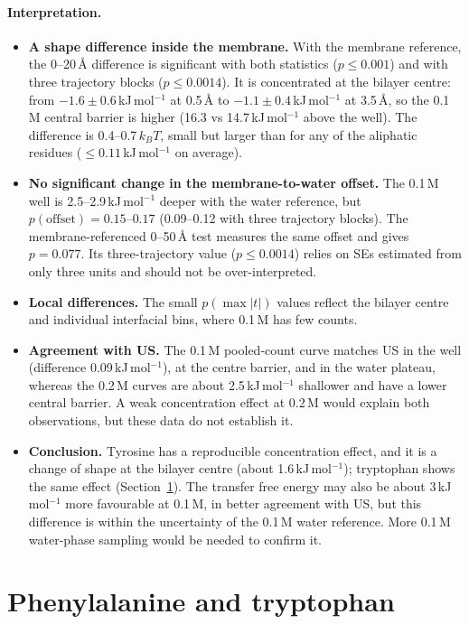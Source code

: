 \documentclass[11pt,a4paper]{article}
\newcommand{\kJ}{\,kJ\,mol$^{-1}$}
\begin{document}
\paragraph{Interpretation.}
\begin{itemize}
  \item \textbf{A shape difference inside the membrane.} With the membrane reference, the
  0--20\,\AA{} difference is significant with both statistics ($p \le 0.001$) and with three
  trajectory blocks ($p \le 0.0014$). It is concentrated at the bilayer centre: from
  $-1.6 \pm 0.6$\kJ{} at 0.5\,\AA{} to $-1.1 \pm 0.4$\kJ{} at 3.5\,\AA, so the 0.1\,M
  central barrier is higher (16.3 vs 14.7\kJ{} above the well). The difference is
  0.4--0.7\,$k_BT$, small but larger than for any of the aliphatic residues
  ($\le 0.11$\kJ{} on average).
  \item \textbf{No significant change in the membrane-to-water offset.} The 0.1\,M well is
  2.5--2.9\kJ{} deeper with the water reference, but $p(\text{offset}) = 0.15$--$0.17$
  (0.09--0.12 with three trajectory blocks). The membrane-referenced 0--50\,\AA{} test
  measures the same offset and gives $p = 0.077$. Its three-trajectory value
  ($p \le 0.0014$) relies on SEs estimated from only three units and should not be
  over-interpreted.
  \item \textbf{Local differences.} The small $p(\max|t|)$ values reflect the bilayer centre
  and individual interfacial bins, where 0.1\,M has few counts.
  \item \textbf{Agreement with US.} The 0.1\,M pooled-count curve matches US in the well
  (difference 0.09\kJ), at the centre barrier, and in the water plateau, whereas the 0.2\,M
  curves are about 2.5\kJ{} shallower and have a lower central barrier. A weak
  concentration effect at 0.2\,M would explain both observations, but these data do not
  establish it.
  \item \textbf{Conclusion.} Tyrosine has a reproducible concentration effect, and it is a
  change of shape at the bilayer centre (about 1.6\kJ); tryptophan shows the same effect
  (Section~\ref{sec:phe_trp}). The transfer free energy may also be about 3\kJ{} more favourable at 0.1\,M, in
  better agreement with US, but this difference is within the uncertainty of the 0.1\,M water
  reference. More 0.1\,M water-phase sampling would be needed to confirm it.
\end{itemize}

\section{Phenylalanine and tryptophan}
\label{sec:phe_trp}
\end{document}
